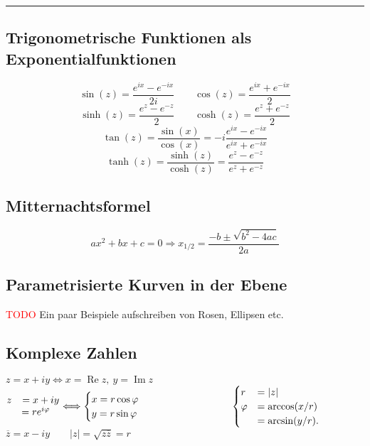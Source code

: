 \documentclass[a4paper,landscape,8pt]{extarticle}
\renewcommand\Re{\operatorname{Re}}
\renewcommand\Im{\operatorname{Im}}
\newcommand{\abs}[1]{\left\lvert #1 \right\rvert}
\newcommand{\todo}{\textcolor{red}{TODO }}
\newcommand{\sep}{\vspace{5pt}\noindent\hrule\vspace{5pt}}
\begin{document}
\begin{multicols*}{4}
\sep

\subsection{Trigonometrische Funktionen als Exponentialfunktionen}
\[
\sin(z) = \frac{e^{ix} - e^{-ix}}{2i}
\qquad
\cos(z) = \frac{e^{ix} + e^{-ix}}{2}
\]
\[
\sinh(z) = \frac{e^z-e^{-z}}{2}
\qquad
\cosh(z) = \frac{e^z+e^{-z}}{2}
\]
\[
\tan(z) = \frac{\sin(x)}{\cos(x)}
= -i\frac{e^{ix} - e^{-ix}}{e^{ix} + e^{-ix}}
\]
\[
\tanh(z) = \frac{\sinh(z)}{\cosh(z)} = \frac{e^z-e^{-z}}{e^z+e^{-z}}
\]

\subsection{Mitternachtsformel}
\[
ax^2+bx+c = 0 \Longrightarrow x_{1/2} = \frac{-b\pm\sqrt{b^2-4ac}}{2a}
\]

\begin{warmup}
\subsection{Parametrisierte Kurven in der Ebene}

\todo Ein paar Beispiele aufschreiben von Rosen, Ellipsen etc.
\end{warmup}

\subsection{Komplexe Zahlen}

$z = x + iy  \Longleftrightarrow x= \Re z,  \ y = \Im z$\\
$\begin{matrix}
z & = x + iy\\
  & = re^{i\varphi} \ \ \ \\
\end{matrix}
 \Longleftrightarrow \begin{cases}
x = r \cos \varphi & \\
y = r \sin \varphi
\end{cases}
\\
\qquad\qquad\qquad\qquad\begin{cases}
r    &= \abs{z}\\
\varphi &= \arccos(x/r)\\
     &= \arcsin(y/r).
\end{cases}$\\
$\overline{z} = x-iy \qquad \abs{z} = \sqrt{z\overline{z}} = r$


\end{multicols*}
\end{document}
